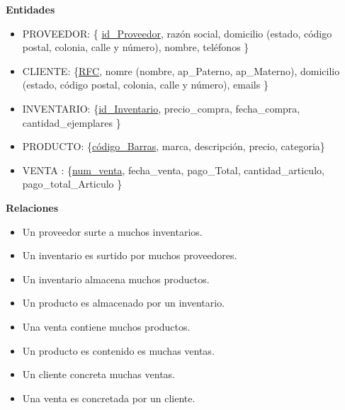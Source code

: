 \documentclass[12pt,letterpaper]{article}
\begin{document}
			\textbf{Entidades}\par 
			\begin{itemize}
				\item PROVEEDOR: \{ \underline{id\_Proveedor}, razón social, domicilio (estado, código postal, colonia, calle y número), nombre, teléfonos \}
				\item CLIENTE: \{\underline{RFC}, nomre (nombre, ap\_Paterno, ap\_Materno), domicilio (estado, código postal, colonia, calle y número), emails \}
				\item INVENTARIO: \{\underline{id\_Inventario}, precio\_compra, fecha\_compra, cantidad\_ejemplares \}
				
				\item PRODUCTO: \{\underline{código\_Barras}, marca, descripción, precio, categoria\}
				\item VENTA : \{\underline{num\_venta}, fecha\_venta, pago\_Total, cantidad\_articulo, pago\_total\_Articulo \}
			\end{itemize}
		
			\textbf{Relaciones}\par
			\begin{itemize}
				\item Un proveedor surte a muchos inventarios.
				\item Un inventario es surtido por muchos proveedores. \\
				\item Un inventario almacena muchos productos.
				\item Un producto es almacenado por un inventario.\\
				\item Una venta contiene muchos productos.
				\item Un producto es contenido es muchas ventas.\\
				\item Un cliente concreta muchas ventas.
				\item Una venta es concretada por un cliente.
				
			\end{itemize}
\end{document}
